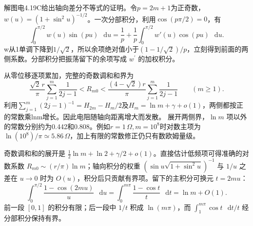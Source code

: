 \documentclass[UTF8,fontset=fandol,a4paper,11pt]{ctexart}
\newcommand{\dd}{\mathop{}\!\mathrm{d}}
\newcommand{\figcaption}[1]{\par\vspace{2pt}{\small\color{muted}#1}\par}
\begin{document}
解图电4.19C给出轴向差分不等式的证明。令$p=2m+1$为正奇数，$w(u)=(1+\sin^2u)^{-1/2}$。一次分部积分，利用$\cos(p\pi/2)=0$，有
\[
\int_0^{\pi/2}w(u)\sin(pu)\,\dd u
=\frac1p+\frac1p\int_0^{\pi/2}w'(u)\cos(pu)\,\dd u.
\]
w从1单调下降到$1/\sqrt2$，所以余项绝对值小于$(1-1/\sqrt2)/p$，立刻得到前面的两侧系数。分部积分把振荡留下的余项写成 $w^\prime$ 的加权积分。

从零位移逐项累加，完整的奇数调和和界为
\[
\frac{\sqrt2\,r}{\pi}\sum_{j=1}^{m}\frac1{2j-1}
<R_{m0}<\frac{(4-\sqrt2)r}{\pi}\sum_{j=1}^{m}\frac1{2j-1}\qquad(m\ge1).
\]
利用$\sum_{j=1}^{m}(2j-1)^{-1}=H_{2m}-H_m/2$及$H_m=\ln m+\gamma+o(1)$，两侧都按正的常数乘lnm增长。因此电阻随轴向距离增大而发散。
展开两侧界，$\ln m$ 项以外的常数分别约为0.442和0.808。例如$r=1\,\Omega,m=10^8$时对数主项为$\ln(10^8)/\pi\simeq5.86\,\Omega$，加上有限的常数修正仍只有数欧姆量级。

奇数调和和的展开是 $\tfrac12\ln m+\ln2+\gamma/2+o(1)$。直接估计低频项可得准确的对数系数
$R_{m0}\sim(r/\pi)\ln m$；轴向积分的权重 $(\sin u\sqrt{1+\sin^2u})^{-1}$ 与 $1/u$ 之差在 $u\to0$ 时为 $O(u)$，积分后只贡献有界项。留下的主积分可换元 $t=2mu$：
\[
\int_0^{\pi/2}\frac{1-\cos(2mu)}u\,\dd u
=\int_0^{m\pi}\frac{1-\cos t}t\,\dd t=\ln m+O(1).
\]
前一段 $[0,1]$ 的积分有限；后一段中 $1/t$ 积成 $\ln(m\pi)$，而 $\int_1^{m\pi}\cos t\,\dd t/t$ 经分部积分保持有界。

\begin{center}\begin{minipage}{.98\linewidth}\centering
{}
\figcaption{解图电4.19D\quad 推广前先确定边的电导和邻接方向}
\end{minipage}\end{center}
\end{document}
